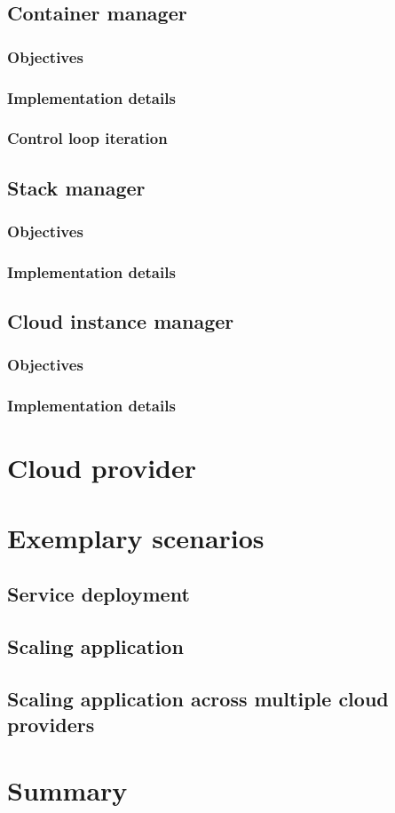 \subsection{Container manager}

\subsubsection{Objectives}
\subsubsection{Implementation details}
\subsubsection{Control loop iteration}


\subsection{Stack manager}

\subsubsection{Objectives}
\subsubsection{Implementation details}


\subsection{Cloud instance manager}

\subsubsection{Objectives}
\subsubsection{Implementation details}


\section{Cloud provider}

\section{Exemplary scenarios}

\subsection{Service deployment}

\subsection{Scaling application}

\subsection{Scaling application across multiple cloud providers}

\section{Summary}

